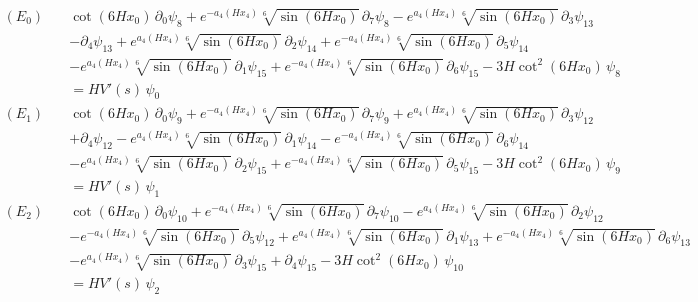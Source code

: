 \begin{align*}
(E_{0})\quad & \cot \left(6 H x_0\right)\,\partial_{0}\psi_{8} + e^{-a_4\left(H x_4\right)} \sqrt[6]{\sin \left(6 H x_0\right)}\,\partial_{7}\psi_{8} - e^{a_4\left(H x_4\right)} \sqrt[6]{\sin \left(6 H x_0\right)}\,\partial_{3}\psi_{13} \\
 &  - \partial_{4}\psi_{13} + e^{a_4\left(H x_4\right)} \sqrt[6]{\sin \left(6 H x_0\right)}\,\partial_{2}\psi_{14} + e^{-a_4\left(H x_4\right)} \sqrt[6]{\sin \left(6 H x_0\right)}\,\partial_{5}\psi_{14} \\
 &  - e^{a_4\left(H x_4\right)} \sqrt[6]{\sin \left(6 H x_0\right)}\,\partial_{1}\psi_{15} + e^{-a_4\left(H x_4\right)} \sqrt[6]{\sin \left(6 H x_0\right)}\,\partial_{6}\psi_{15} - 3 H \cot ^2\left(6 H x_0\right)\,\psi_{8} \\
 & = H V'(s)\,\psi_{0}
\end{align*}
\begin{align*}
(E_{1})\quad & \cot \left(6 H x_0\right)\,\partial_{0}\psi_{9} + e^{-a_4\left(H x_4\right)} \sqrt[6]{\sin \left(6 H x_0\right)}\,\partial_{7}\psi_{9} + e^{a_4\left(H x_4\right)} \sqrt[6]{\sin \left(6 H x_0\right)}\,\partial_{3}\psi_{12} \\
 &  + \partial_{4}\psi_{12} - e^{a_4\left(H x_4\right)} \sqrt[6]{\sin \left(6 H x_0\right)}\,\partial_{1}\psi_{14} - e^{-a_4\left(H x_4\right)} \sqrt[6]{\sin \left(6 H x_0\right)}\,\partial_{6}\psi_{14} \\
 &  - e^{a_4\left(H x_4\right)} \sqrt[6]{\sin \left(6 H x_0\right)}\,\partial_{2}\psi_{15} + e^{-a_4\left(H x_4\right)} \sqrt[6]{\sin \left(6 H x_0\right)}\,\partial_{5}\psi_{15} - 3 H \cot ^2\left(6 H x_0\right)\,\psi_{9} \\
 & = H V'(s)\,\psi_{1}
\end{align*}
\begin{align*}
(E_{2})\quad & \cot \left(6 H x_0\right)\,\partial_{0}\psi_{10} + e^{-a_4\left(H x_4\right)} \sqrt[6]{\sin \left(6 H x_0\right)}\,\partial_{7}\psi_{10} - e^{a_4\left(H x_4\right)} \sqrt[6]{\sin \left(6 H x_0\right)}\,\partial_{2}\psi_{12} \\
 &  - e^{-a_4\left(H x_4\right)} \sqrt[6]{\sin \left(6 H x_0\right)}\,\partial_{5}\psi_{12} + e^{a_4\left(H x_4\right)} \sqrt[6]{\sin \left(6 H x_0\right)}\,\partial_{1}\psi_{13} + e^{-a_4\left(H x_4\right)} \sqrt[6]{\sin \left(6 H x_0\right)}\,\partial_{6}\psi_{13} \\
 &  - e^{a_4\left(H x_4\right)} \sqrt[6]{\sin \left(6 H x_0\right)}\,\partial_{3}\psi_{15} + \partial_{4}\psi_{15} - 3 H \cot ^2\left(6 H x_0\right)\,\psi_{10} \\
 & = H V'(s)\,\psi_{2}
\end{align*}
